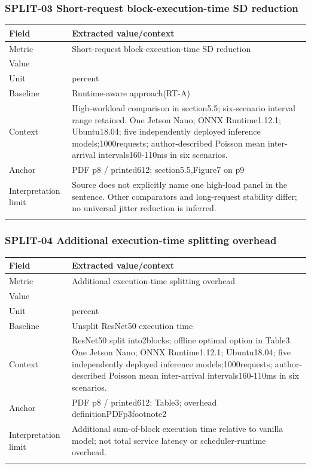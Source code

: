 \subsubsection*{SPLIT-03 Short-request block-execution-time SD reduction}
\begin{longtable}{>{\raggedright\arraybackslash}p{}>{\raggedright\arraybackslash}p{}}
\toprule
\textbf{Field} & \textbf{Extracted value/context}\\\midrule\endhead
Metric & Short-request block-execution-time SD reduction\\\addlinespace
Value & 69.3\\\addlinespace
Unit & percent\\\addlinespace
Baseline & Runtime-aware approach(RT-A)\\\addlinespace
Context & High-workload comparison in section5.5;\allowbreak{} six-scenario interval range retained. One Jetson Nano;\allowbreak{} ONNX Runtime1.12.1;\allowbreak{} Ubuntu18.04;\allowbreak{} five independently deployed inference models;\allowbreak{}1000requests;\allowbreak{} author-described Poisson mean inter-arrival intervals160-110ms in six scenarios.\\\addlinespace
Anchor & PDF p8 / printed612;\allowbreak{} section5.5,\allowbreak{}Figure7 on p9\\\addlinespace
Interpretation limit & Source does not explicitly name one high-load panel in the sentence. Other comparators and long-request stability differ;\allowbreak{} no universal jitter reduction is inferred.\\\addlinespace
\bottomrule\end{longtable}
\subsubsection*{SPLIT-04 Additional execution-time splitting overhead}
\begin{longtable}{>{\raggedright\arraybackslash}p{}>{\raggedright\arraybackslash}p{}}
\toprule
\textbf{Field} & \textbf{Extracted value/context}\\\midrule\endhead
Metric & Additional execution-time splitting overhead\\\addlinespace
Value & 15.4\\\addlinespace
Unit & percent\\\addlinespace
Baseline & Unsplit ResNet50 execution time\\\addlinespace
Context & ResNet50 split into2blocks;\allowbreak{} offline optimal option in Table3. One Jetson Nano;\allowbreak{} ONNX Runtime1.12.1;\allowbreak{} Ubuntu18.04;\allowbreak{} five independently deployed inference models;\allowbreak{}1000requests;\allowbreak{} author-described Poisson mean inter-arrival intervals160-110ms in six scenarios.\\\addlinespace
Anchor & PDF p8 / printed612;\allowbreak{} Table3;\allowbreak{} overhead definitionPDFp3footnote2\\\addlinespace
Interpretation limit & Additional sum-of-block execution time relative to vanilla model;\allowbreak{} not total service latency or scheduler-runtime overhead.\\\addlinespace
\bottomrule\end{longtable}
